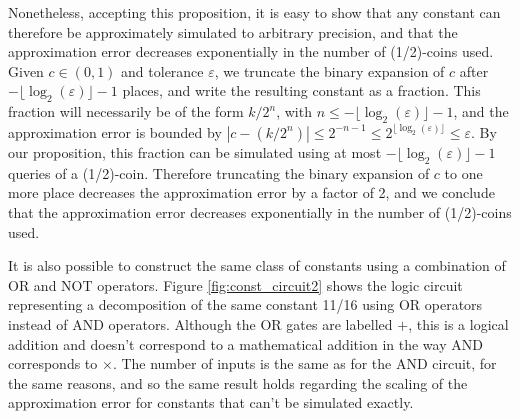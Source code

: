 \documentclass{article}
\theoremstyle{definition}
\newcommand{\AND}{{\footnotesize AND }}
\newcommand{\OR}{{\footnotesize OR }}
\newcommand{\NOT}{{\footnotesize NOT }}
\begin{document}
Nonetheless, accepting this proposition, it is easy to show that any constant can therefore be approximately simulated to arbitrary precision, and that the approximation error decreases exponentially in the number of (1/2)-coins used. Given $c \in (0,1)$ and tolerance $\varepsilon$, we truncate the binary expansion of $c$ after $-\lfloor\log_2(\varepsilon)\rfloor -1$ places, and write the resulting constant as a fraction. This fraction will necessarily be of the form $k/2^n$, with $n\leq -\lfloor\log_2(\varepsilon)\rfloor -1$, and the approximation error is bounded by $|c-(k/2^n)| \leq 2^{-n-1} \leq 2^{\lfloor\log_2(\varepsilon)\rfloor} \leq \varepsilon$.
By our proposition, this fraction can be simulated using at most $-\lfloor\log_2(\varepsilon)\rfloor -1$ queries of a (1/2)-coin. Therefore truncating the binary expansion of $c$ to one more place decreases the approximation error by a factor of 2, and we conclude that the approximation error decreases exponentially in the number of (1/2)-coins used.

It is also possible to construct the same class of constants using a combination of \OR and \NOT operators. Figure \ref{fig:const_circuit2} shows the logic circuit representing a decomposition of the same constant 11/16 using \OR operators instead of \AND operators. Although the \OR gates are labelled $+$, this is a logical addition and doesn't correspond to a mathematical addition in the way \AND corresponds to $\times$.
The number of inputs is the same as for the \AND circuit, for the same reasons, and so the same result holds regarding the scaling of the approximation error for constants that can't be simulated exactly.
\end{document}
